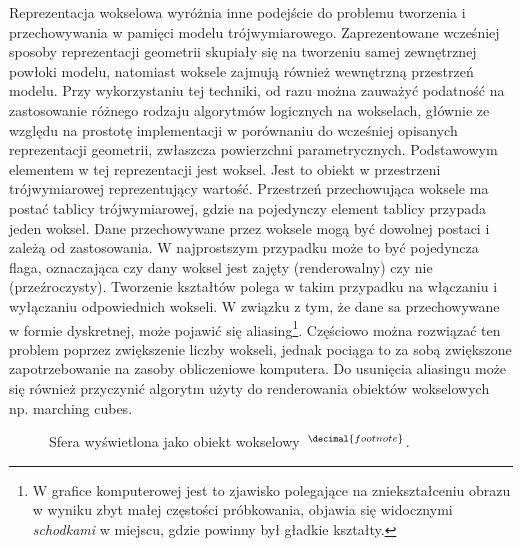 Reprezentacja wokselowa wyróżnia inne podejście do problemu tworzenia i
przechowywania w pamięci modelu trójwymiarowego. Zaprezentowane wcześniej
sposoby reprezentacji geometrii skupiały się na tworzeniu samej zewnętrznej
powłoki modelu, natomiast woksele zajmują również wewnętrzną przestrzeń modelu.
Przy wykorzystaniu tej techniki, od razu można zauważyć podatność na
zastosowanie różnego rodzaju algorytmów logicznych na wokselach, głównie ze względu na
prostotę implementacji w porównaniu do wcześniej opisanych reprezentacji
geometrii, zwłaszcza powierzchni parametrycznych. Podstawowym elementem w tej
reprezentacji jest woksel. Jest to obiekt w przestrzeni trójwymiarowej
reprezentujący wartość. Przestrzeń przechowująca woksele ma postać tablicy
trójwymiarowej, gdzie na pojedynczy element tablicy przypada jeden woksel. Dane przechowywane przez woksele mogą być dowolnej
postaci i zależą od zastosowania. W najprostszym przypadku może to być
pojedyncza flaga, oznaczająca czy dany woksel jest zajęty (renderowalny) czy
nie (przeźroczysty). Tworzenie kształtów polega w takim przypadku na włączaniu i
wyłączaniu odpowiednich wokseli. W związku z tym, że dane sa przechowywane w
formie dyskretnej, może pojawić się aliasing\footnote{W grafice komputerowej
jest to zjawisko polegające na zniekształceniu obrazu w wyniku zbyt małej częstości
próbkowania, objawia się widocznymi \emph{schodkami} w miejscu, gdzie powinny
był gładkie kształty.}. Częściowo można rozwiązać ten problem poprzez
zwiększenie liczby wokseli, jednak pociąga to za sobą zwiększone zapotrzebowanie
na zasoby obliczeniowe komputera. Do usunięcia aliasingu może się również
przyczynić algorytm użyty do renderowania obiektów wokselowych np. marching
cubes.

{
\begin{figure}[h]
  \centering
  \label{fig:voxel_sphere}
  \caption{Sfera wyświetlona jako obiekt wokselowy~$^{\decimal{footnote}}$.}
\end{figure}
}

